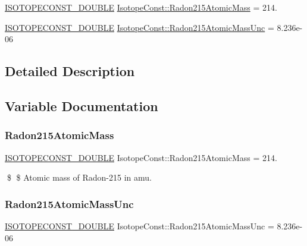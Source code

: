 \begin{DoxyCompactItemize}
\item 
\mbox{\hyperlink{group___isotope_const-_macros_ga8f45a7272ce02c0b4c65c44636ed719a}{I\+S\+O\+T\+O\+P\+E\+C\+O\+N\+S\+T\+\_\+\+D\+O\+U\+B\+LE}} \mbox{\hyperlink{group___isotope_const-_radon-_rn215_ga927ce71955a9a46fe8914f23768e30e1}{Isotope\+Const\+::\+Radon215\+Atomic\+Mass}} = 214.
\item 
\mbox{\hyperlink{group___isotope_const-_macros_ga8f45a7272ce02c0b4c65c44636ed719a}{I\+S\+O\+T\+O\+P\+E\+C\+O\+N\+S\+T\+\_\+\+D\+O\+U\+B\+LE}} \mbox{\hyperlink{group___isotope_const-_radon-_rn215_gae28a37b6cfe8672cee18bea21505434e}{Isotope\+Const\+::\+Radon215\+Atomic\+Mass\+Unc}} = 8.\+236e-\/06
\end{DoxyCompactItemize}


\subsection{Detailed Description}


\subsection{Variable Documentation}
\mbox{\label{group___isotope_const-_radon-_rn215_ga927ce71955a9a46fe8914f23768e30e1}} 
\subsubsection{\texorpdfstring{Radon215\+Atomic\+Mass}{Radon215AtomicMass}}
{\footnotesize\ttfamily \mbox{\hyperlink{group___isotope_const-_macros_ga8f45a7272ce02c0b4c65c44636ed719a}{I\+S\+O\+T\+O\+P\+E\+C\+O\+N\+S\+T\+\_\+\+D\+O\+U\+B\+LE}} Isotope\+Const\+::\+Radon215\+Atomic\+Mass = 214.}

\$ \$ Atomic mass of Radon-\/215 in amu. \mbox{\label{group___isotope_const-_radon-_rn215_gae28a37b6cfe8672cee18bea21505434e}} 
\subsubsection{\texorpdfstring{Radon215\+Atomic\+Mass\+Unc}{Radon215AtomicMassUnc}}
{\footnotesize\ttfamily \mbox{\hyperlink{group___isotope_const-_macros_ga8f45a7272ce02c0b4c65c44636ed719a}{I\+S\+O\+T\+O\+P\+E\+C\+O\+N\+S\+T\+\_\+\+D\+O\+U\+B\+LE}} Isotope\+Const\+::\+Radon215\+Atomic\+Mass\+Unc = 8.\+236e-\/06}

